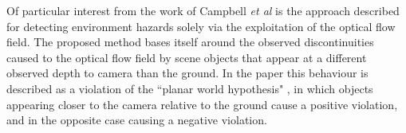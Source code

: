 %


Of particular interest from the work of Campbell \textit{et al} \cite{campbell} is the approach described for detecting environment hazards solely via the exploitation of the optical flow field. The proposed method bases itself around the observed discontinuities caused to the optical flow field by scene objects that appear at a different observed depth to camera than the ground. In the paper this behaviour is described as a violation of the ``planar world hypothesis" \cite{campbell}, in which objects appearing closer to the camera relative to the ground cause a positive violation, and in the opposite case causing a negative violation. 

